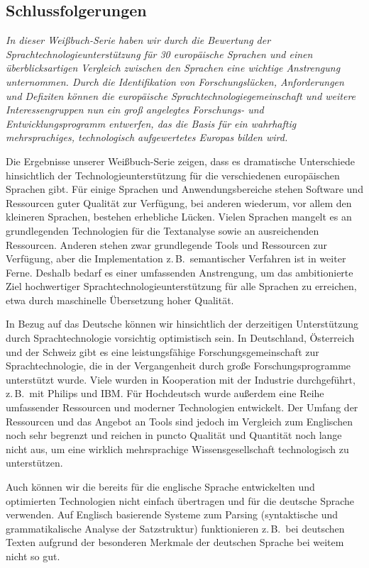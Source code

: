 \documentclass[]{../../metanetpaper}
\begin{document}
\begin{multicols}{2}
\subsection{Schlussfolgerungen}

\emph{In dieser Weißbuch-Serie haben wir durch die Bewertung der Sprachtechnologieunterstützung für 30 europäische Sprachen und einen überblicksartigen Vergleich zwischen den Sprachen eine wichtige Anstrengung unternommen. Durch die Identifikation von Forschungslücken, Anforderungen und Defiziten können die europäische Sprachtechnologiegemeinschaft und weitere Interessengruppen nun ein groß angelegtes Forschungs- und Entwicklungsprogramm entwerfen, das die Basis für ein wahrhaftig mehrsprachiges, technologisch aufgewertetes Europas bilden wird.}

Die Ergebnisse unserer Weißbuch-Serie zeigen, dass es dramatische Unterschiede hinsichtlich der Technologieunterstützung für die verschiedenen europäischen Sprachen gibt. Für einige Sprachen und Anwendungsbereiche stehen Software und Ressourcen guter Qualität zur Verfügung, bei anderen wiederum, vor allem den kleineren Sprachen, bestehen erhebliche Lücken. Vielen Sprachen mangelt es an grundlegenden Technologien für die Textanalyse sowie an ausreichenden Ressourcen. Anderen stehen zwar grundlegende Tools und Ressourcen zur Verfügung, aber die Implementation z.\,B.~semantischer Verfahren ist in weiter Ferne. Deshalb bedarf es einer umfassenden Anstrengung, um das ambitionierte Ziel hochwertiger Sprachtechnologieunterstützung für alle Sprachen zu erreichen, etwa durch maschinelle Übersetzung hoher Qualität.

In Bezug auf das Deutsche können wir hinsichtlich der derzeitigen Unterstützung durch Sprachtechnologie vorsichtig optimistisch sein. In Deutschland, Österreich und der Schweiz gibt es eine leistungsfähige Forschungsgemeinschaft zur Sprachtechnologie, die in der Vergangenheit durch große Forschungsprogramme unterstützt wurde. Viele wurden in Kooperation mit der Industrie durchgeführt, z.\,B.~mit Philips und IBM. Für Hochdeutsch wurde außerdem eine Reihe umfassender Ressourcen und moderner Technologien entwickelt. Der Umfang der Ressourcen und das Angebot an Tools sind jedoch im Vergleich zum Englischen noch sehr begrenzt und reichen in puncto Qualität und Quantität noch lange nicht aus, um eine wirklich mehrsprachige Wissensgesellschaft technologisch zu unterstützen.

Auch können wir die bereits für die englische Sprache entwickelten und optimierten Technologien nicht einfach übertragen und für die deutsche Sprache verwenden. Auf Englisch basierende Systeme zum Parsing (syntaktische und grammatikalische Analyse der Satzstruktur) funktionieren z.\,B.~bei deutschen Texten aufgrund der besonderen Merkmale der deutschen Sprache bei weitem nicht so gut.


\end{multicols}
\end{document}
